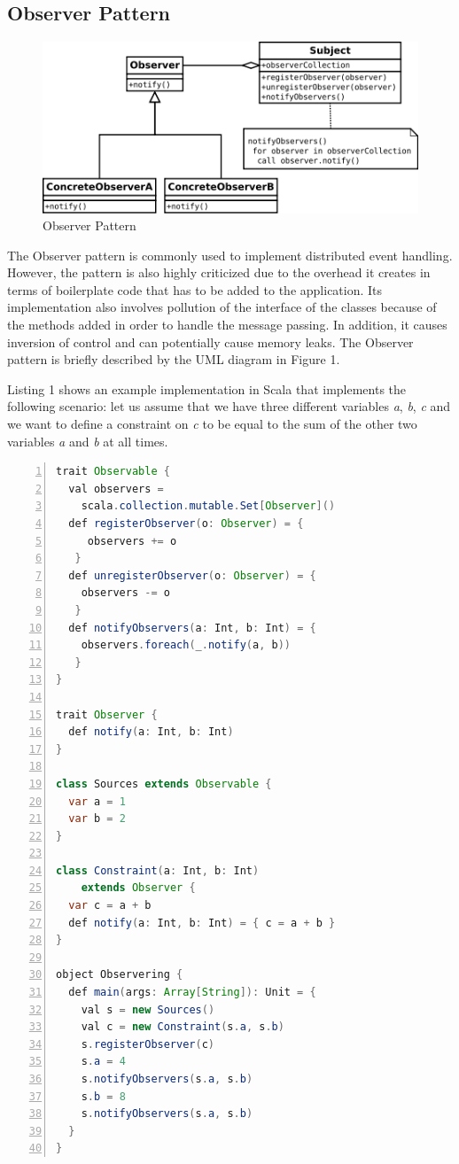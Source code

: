 \documentclass{sigplanconf}
\begin{document}
\subsection{Observer Pattern}

\begin{figure}
\centering
\includegraphics[width=\columnwidth]{observer}
\caption{Observer Pattern}
\end{figure}

The Observer pattern \cite{ojpg} is commonly used to implement distributed event handling. However, the pattern is also highly criticized due to the overhead it creates in terms of boilerplate code that has to be added to the application. Its implementation also involves pollution of the interface of the classes because of the methods added in order to handle the message passing. In addition, it causes inversion of control and can potentially cause memory leaks. The Observer pattern is briefly described by the UML diagram in Figure 1.

Listing 1 shows an example implementation in Scala that implements the following scenario: let us assume that we have three different variables  \textit{a}, \textit{b}, \textit{c} and we want to define a constraint on \textit{c} to be equal to the sum of the other two variables \textit{a} and \textit{b} at all times.

\begin{lstlisting}[frame=single,caption=Observer Pattern in Scala, captionpos=b,linewidth=\columnwidth, language=java, basicstyle=\small, morekeywords={def,val,var,object, trait}, keywordstyle=\color{blue},
numbers=left, numbersep=5pt] 
trait Observable {
  val observers = 
    scala.collection.mutable.Set[Observer]()
  def registerObserver(o: Observer) = {
	 observers += o 
   }
  def unregisterObserver(o: Observer) = { 
	observers -= o 
   }
  def notifyObservers(a: Int, b: Int) = {
	observers.foreach(_.notify(a, b)) 
   }
}

trait Observer {
  def notify(a: Int, b: Int)
}

class Sources extends Observable {
  var a = 1
  var b = 2
}

class Constraint(a: Int, b: Int) 
	extends Observer {
  var c = a + b
  def notify(a: Int, b: Int) = { c = a + b }
}

object Observering {
  def main(args: Array[String]): Unit = {
    val s = new Sources()
    val c = new Constraint(s.a, s.b)
    s.registerObserver(c)
    s.a = 4
    s.notifyObservers(s.a, s.b)
    s.b = 8
    s.notifyObservers(s.a, s.b)
  }
}

\end{lstlisting}
\end{document}

